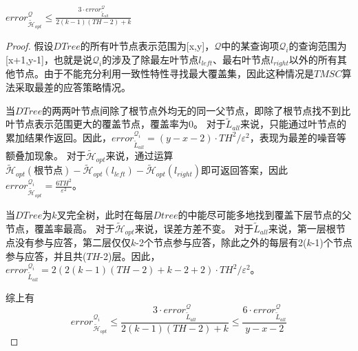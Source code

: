 \begin{prop}
	$error_{\tilde{\mathcal{H}}_{opt}}^{\mathcal{Q}} \leqslant \frac{3 \cdotp error_{\tilde{L}_{all}}^{\mathcal{Q}}}{2(k-1)(TH-2)+k}$
\end{prop}
\begin{proof}
	假设$DTree$的所有叶节点表示范围为[x,y]，$\mathcal{Q}$中的某查询项$\mathcal{Q}_{i}$的查询范围为[x+1,y-1]，也就是说$\mathcal{Q}_{i}$的涉及了除最左叶节点$l_{left}$、最右叶节点$l_{right}$以外的所有其他节点。由于不能充分利用一致性特性寻找最大覆盖集，因此这种情况是$TMSC$算法采取最差的应答策略情况。
	
	当$DTree$的两两叶节点间除了根节点外均无的同一父节点，即除了根节点找不到比叶节点表示范围更大的覆盖节点，覆盖率为0。
	对于$\tilde{L}_{all}$来说，只能通过叶节点的累加结果作返回。因此，$error_{\tilde{L}_{all}}^{\mathcal{Q}_{i}} = (y-x-2) \cdotp TH^2/\varepsilon^2$，表现为最差的噪音等额叠加现象。
	对于$\tilde{\mathcal{H}}_{opt}$来说，通过运算$\tilde{\mathcal{H}}_{opt}(\text{根节点}) - \tilde{\mathcal{H}}_{opt}(l_{left}) - \tilde{\mathcal{H}}_{opt}(l_{right})$即可返回答案，因此$error_{\tilde{\mathcal{H}}_{opt}}^{\mathcal{Q}_{i}} = \frac{6TH^2}{\varepsilon^2}$。
	
	当$DTree$为$k$叉完全树，此时在每层$Dtree$的中能尽可能多地找到覆盖下层节点的父节点，覆盖率最高。
	对于$\tilde{\mathcal{H}}_{opt}$来说，误差方差不变。
	对于$\tilde{L}_{all}$来说，第一层根节点没有参与应答，第二层仅仅$k$-2个节点参与应答，除此之外的每层有2($k$-1)个节点参与应答，并且共($TH$-2)层。因此，$error_{\tilde{L}_{all}}^{\mathcal{Q}_{i}} = 2(2(k-1)(TH-2)+k-2+2) \cdotp TH^2/\varepsilon^2$。
	
	综上有
	\[
	error_{\tilde{\mathcal{H}}_{opt}}^{\mathcal{Q}_{i}} \leqslant \frac{3 \cdotp error_{\tilde{L}_{all}}^{\mathcal{Q}}}{2(k-1)(TH-2)+k} \leqslant \frac{6 \cdotp error_{\tilde{L}_{all}}^{\mathcal{Q}}}{y-x-2}
	\]
\end{proof}